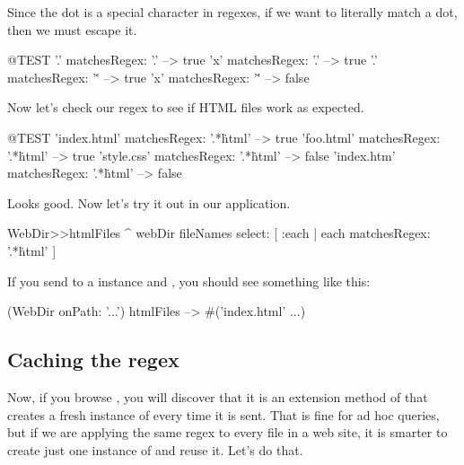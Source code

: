 \documentclass[a4paper,10pt,twoside]{book}
\begin{document}
Since the dot is a special character in regexes, if we want to literally match a dot, then we must escape it.

\begin{code}{@TEST}
'.' matchesRegex: '.'   --> true
'x' matchesRegex: '.'  --> true
'.' matchesRegex: '\.'  --> true
'x' matchesRegex: '\.' --> false
\end{code}

Now let's check our regex to see if HTML files work as expected.

\begin{code}{@TEST}
'index.html' matchesRegex: '.*\.html' --> true
'foo.html' matchesRegex: '.*\.html'    --> true
'style.css' matchesRegex: '.*\.html'   --> false
'index.htm' matchesRegex: '.*\.html' --> false
\end{code}

Looks good. Now let's try it out in our application.


\begin{code}{}
WebDir>>htmlFiles
	^ webDir fileNames select: [ :each | each matchesRegex: '.*\.html' ]
\end{code}

If you send  to a  instance and , you should see something like this:

\begin{code}{}
(WebDir onPath: '...') htmlFiles --> #('index.html' ...)
\end{code}

\subsection{Caching the regex}

Now, if you browse , you will discover that it is an extension method of  that creates a fresh instance of  every time it is sent.  That is fine for ad hoc queries, but if we are applying the same regex to every file in a web site, it is smarter to create just one instance of  and reuse it. Let's do that.

\end{document}
